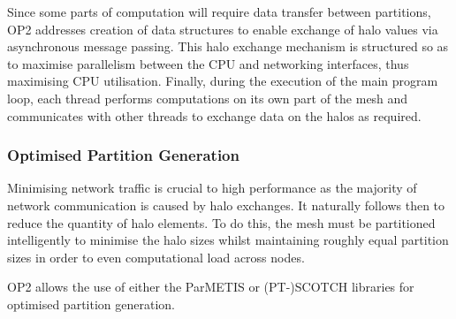 Since some parts of computation will require data transfer between partitions, OP2 addresses creation of data structures to enable exchange of halo values via asynchronous message passing. This halo exchange mechanism is structured so as to maximise parallelism between the CPU and networking interfaces, thus maximising CPU utilisation. Finally, during the execution of the main program loop, each thread performs computations on its own part of the mesh and communicates with other threads to exchange data on the halos as required.





\subsubsection{Optimised Partition Generation}
Minimising network traffic is crucial to high performance as the majority of network communication is caused by halo exchanges. It naturally follows then to reduce the quantity of halo elements. To do this, the mesh must be partitioned intelligently to minimise the halo sizes whilst maintaining roughly equal partition sizes in order to even computational load across nodes.  

OP2 allows the use of either the ParMETIS\cite{parMetisBook} or (PT-)SCOTCH\cite{ptscotchOverview} libraries for optimised partition generation. 


